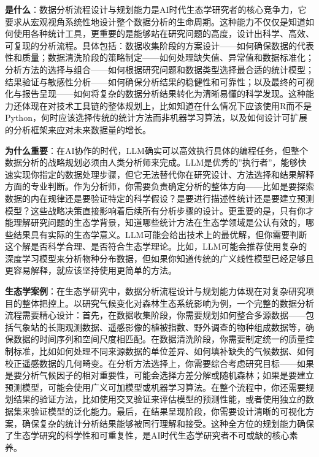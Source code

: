 \documentclass[
  twoside]{book}
\begin{document}
\textbf{是什么}：数据分析流程设计与规划能力是AI时代生态学研究者的核心竞争力，它要求从宏观视角系统性地设计整个数据分析的生命周期。这种能力不仅仅是知道如何使用各种统计工具，更重要的是能够站在研究问题的高度，设计出科学、高效、可复现的分析流程。具体包括：数据收集阶段的方案设计------如何确保数据的代表性和质量；数据清洗阶段的策略制定------如何处理缺失值、异常值和数据标准化；分析方法的选择与组合------如何根据研究问题和数据类型选择最合适的统计模型；结果验证与敏感性分析------如何确保分析结果的稳健性和可靠性；以及最终的可视化与报告呈现------如何将复杂的数据分析结果转化为清晰易懂的科学发现。这种能力还体现在对技术工具链的整体规划上，比如知道在什么情况下应该使用R而不是Python，何时应该选择传统的统计方法而非机器学习算法，以及如何设计可扩展的分析框架来应对未来数据量的增长。

\textbf{为什么重要}：在AI协作的时代，LLM确实可以高效执行具体的编程任务，但整个数据分析的战略规划必须由人类分析师来完成。LLM是优秀的''执行者''，能够快速实现你指定的数据处理步骤，但它无法替代你在研究设计、方法选择和结果解释方面的专业判断。作为分析师，你需要负责确定分析的整体方向------比如是要探索数据的内在规律还是要验证特定的科学假设？是要进行描述性统计还是要建立预测模型？这些战略决策直接影响着后续所有分析步骤的设计。更重要的是，只有你才能理解研究问题的生态学背景，知道哪些统计方法在生态学领域是公认有效的，哪些结果具有实际的生态学意义。LLM可能会给出技术上的最优解，但你需要判断这个解是否科学合理、是否符合生态学理论。比如，LLM可能会推荐使用复杂的深度学习模型来分析物种分布数据，但如果你知道传统的广义线性模型已经足够且更容易解释，就应该坚持使用更简单的方法。

\textbf{生态学案例}：在生态学研究中，数据分析流程设计与规划能力体现在对复杂研究项目的整体把控上。以研究气候变化对森林生态系统影响为例，一个完整的数据分析流程需要精心设计：首先，在数据收集阶段，你需要规划如何整合多源数据------包括气象站的长期观测数据、遥感影像的植被指数、野外调查的物种组成数据等，确保数据的时间序列和空间尺度相匹配。在数据清洗阶段，你需要制定统一的质量控制标准，比如如何处理不同来源数据的单位差异、如何填补缺失的气候数据、如何校正遥感数据的几何畸变。在分析方法选择上，你需要综合考虑研究目标------如果是要分析气候因子的相对重要性，可能会选择方差分解或随机森林；如果是要建立预测模型，可能会使用广义可加模型或机器学习算法。在整个流程中，你还需要规划结果的验证方法，比如使用交叉验证来评估模型的预测性能，或者使用独立的数据集来验证模型的泛化能力。最后，在结果呈现阶段，你需要设计清晰的可视化方案，确保复杂的统计分析结果能够被同行理解和接受。这种全方位的规划能力确保了生态学研究的科学性和可重复性，是AI时代生态学研究者不可或缺的核心素养。
\end{document}
